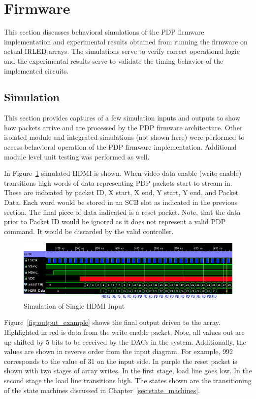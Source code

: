 \section{Firmware}
    This section discusses behavioral simulations of the PDP firmware implementation and experimental results obtained from running the firmware on actual IRLED arrays. The simulations serve to verify correct operational logic and the experimental results serve to validate the timing behavior of the implemented circuits.

    \subsection{Simulation}
    This section provides captures of a few simulation inputs and outputs to show how packets arrive and are processed by the PDP firmware architecture. Other isolated module and integrated simulations (not shown here) were performed to access behavioral operation of the PDP firmware implementation. Additional module level unit testing was performed as well.

    In Figure~\ref{fig:input_example} simulated HDMI is shown. When video data enable (write enable) transitions high words of data representing PDP packets start to stream in. These are indicated by packet ID, X start, X end, Y start, Y end, and Packet Data. Each word would be stored in an SCB slot as indicated in the previous section. The final piece of data indicated is a reset packet. Note, that the data prior to Packet ID would be ignored as it does not represent a valid PDP command. It would be discarded by the valid controller.

    \begin{figure}
        \centering
        \includegraphics[width=1.0\textwidth]{fig/pdp_input_example.png}
        \caption{Simulation of Single HDMI Input}
        \label{fig:input_example}
    \end{figure}

    Figure~\ref{fig:output_example} shows the final output driven to the array. Highlighted in red is data from the write enable packet. Note, all values out are up shifted by 5 bits to be received by the DACs in the system. Additionally, the values are shown in reverse order from the input diagram. For example, 992 corresponds to the value of 31 on the input side. In purple the reset packet is shown with two stages of array writes. In the first stage, load line goes low. In the second stage the load line transitions high. The states shown are the transitioning of the state machines discussed in Chapter~\ref{sec:state_machines}.

